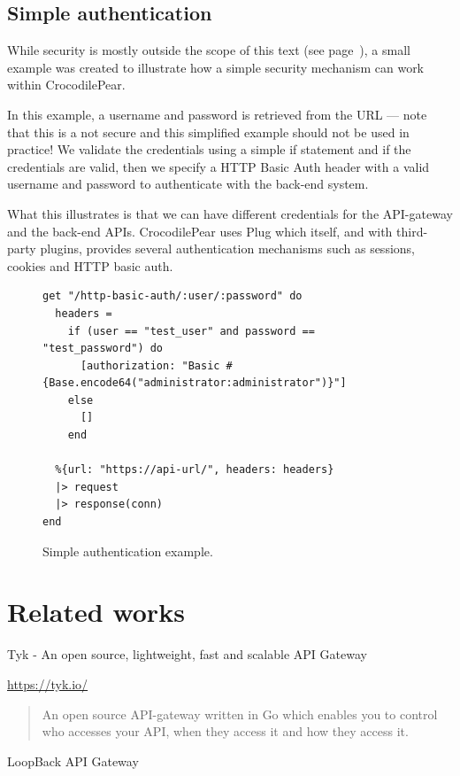 \documentclass{cslthse-msc}
\begin{document}
\subsection{Simple authentication}
While security is mostly outside the scope of this text (see page~\pageref{sec:security}), a small example was created to illustrate how a simple security mechanism can work within CrocodilePear.

In this example, a username and password is retrieved from the URL --- note that this is a not secure and this simplified example should not be used in practice! We validate the credentials using a simple if statement and if the credentials are valid, then we specify a HTTP Basic Auth header with a valid username and password to authenticate with the back-end system.

What this illustrates is that we can have different credentials for the API-gateway and the back-end APIs. CrocodilePear uses Plug which itself, and with third-party plugins, provides several authentication mechanisms such as sessions, cookies and HTTP basic auth.

\begin{figure}[H]
  \centering
\begin{lstlisting}[breaklines=true,frame=single]
get "/http-basic-auth/:user/:password" do
  headers =
    if (user == "test_user" and password == "test_password") do
      [authorization: "Basic #{Base.encode64("administrator:administrator")}"]
    else
      []
    end
  
  %{url: "https://api-url/", headers: headers}
  |> request
  |> response(conn)
end
\end{lstlisting}
  \caption{Simple authentication example.}
\end{figure}

\section{Related works}
Tyk - An open source, lightweight, fast and scalable API Gateway

\noindent \url{https://tyk.io/}

\begin{quote}
	An open source API-gateway written in Go which enables you to control who accesses your API, when they access it and how they access it.
\end{quote}

\vspace{5mm}
\noindent LoopBack API Gateway
\end{document}
